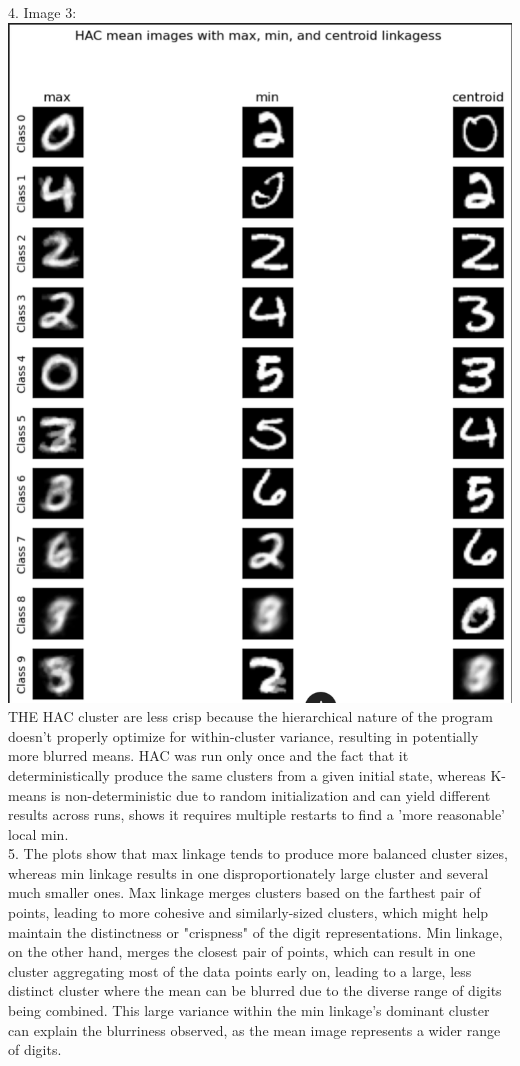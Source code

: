 \documentclass[submit]{harvardml}
\begin{document}
4. Image 3: \includegraphics[width=0.5\linewidth]{hw4/24.png}\\
THE HAC cluster are less crisp because the hierarchical nature of the program doesn't properly optimize for within-cluster variance, resulting in potentially more blurred means. HAC was run only once and the fact that it deterministically produce the same clusters from a given initial state, whereas K-means is non-deterministic due to random initialization and can yield different results across runs, shows it requires multiple restarts to find a 'more reasonable' local min. \\
5. The plots show that max linkage tends to produce more balanced cluster sizes, whereas min linkage results in one disproportionately large cluster and several much smaller ones. Max linkage merges clusters based on the farthest pair of points, leading to more cohesive and similarly-sized clusters, which might help maintain the distinctness or "crispness" of the digit representations. Min linkage, on the other hand, merges the closest pair of points, which can result in one cluster aggregating most of the data points early on, leading to a large, less distinct cluster where the mean can be blurred due to the diverse range of digits being combined. This large variance within the min linkage's dominant cluster can explain the blurriness observed, as the mean image represents a wider range of digits. \\
\end{document}

